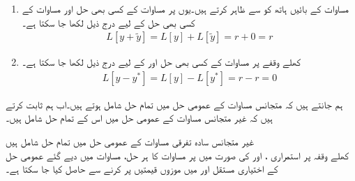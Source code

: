 \begin{enumerate}
\item[(الف)]
مساوات  کے بائیں ہاتھ کو  سے ظاہر کرتے ہیں۔یوں   پر مساوات  کے کسی بھی حل  اور مساوات  کے کسی بھی حل  کے لیے درج ذیل لکھا جا سکتا ہے۔
\begin{align*}
L[y+\tilde{y}]=L[y]+L[\tilde{y}]=r+0=r
\end{align*}
\item[(ب)]
کھلے وقفے  پر مساوات  کے کسی بھی حل  اور  کے لیے درج ذیل لکھا جا سکتا ہے۔
\begin{align*}
L[y-y^*]=L[y]-L[y^*]=r-r=0
\end{align*}
\end{enumerate}

ہم جانتے ہیں کہ متجانس مساوات  کے عمومی حل میں تمام حل شامل ہوتے ہیں۔اب ہم ثابت کرتے ہیں کہ غیر متجانس مساوات  کے عمومی حل میں اس کے تمام حل شامل ہیں۔

\quad غیر متجانس سادہ تفرقی مساوات کے عمومی حل میں تمام حل شامل ہیں\\
کھلے وقفہ  پر استمراری ،  اور  کی صورت میں  پر مساوات  کا ہر حل،  مساوات  میں دیے گئے عمومی حل کے اختیاری مستقل  اور  میں موزوں قیمتیں پر کرنے سے حاصل کیا جا سکتا ہے۔ 

